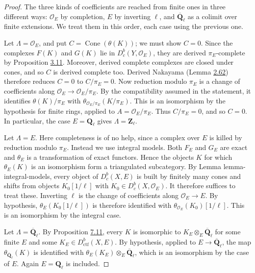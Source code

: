 \documentclass[11pt]{article}
\providecommand{\Cone}{}\renewcommand{\Cone}{\operatorname{Cone}}
\providecommand{\Dbc}{}\renewcommand{\Dbc}{D^b_c}
\begin{document}
\begin{proof}[{Proof}]\label{bp635}%
The three kinds of coefficients are reached from finite ones in three different ways: \(\mathcal O_E\) by completion, \(E\) by inverting \(\ell\), and \(\overline{\mathbf Q}_\ell\) as a colimit over finite extensions. We treat them in this order, each case using the previous one.

Let \(\Lambda=\mathcal O_E\), and put \(C=\Cone(\theta(K))\); we must show \(C=0\). Since the complexes \(F(K)\) and \(G(K)\) lie in \(\Dbc(Y,\mathcal O_E)\), they are derived \(\pi_E\)-complete by Proposition \hyperref[bp226]{3.11}. Moreover, derived complete complexes are closed under cones, and so \(C\) is derived complete too. Derived Nakayama (Lemma \hyperref[bp190]{2.62}) therefore reduces \(C=0\) to \(C/\pi_E=0\). Now reduction modulo \(\pi_E\) is a change of coefficients along \(\mathcal O_E\to\mathcal O_E/\pi_E\). By the compatibility assumed in the statement, it identifies \(\theta(K)/\pi_E\) with \(\theta_{\mathcal O_E/\pi_E}(K/\pi_E)\). This is an isomorphism by the hypothesis for finite rings, applied to \(A=\mathcal O_E/\pi_E\). Thus \(C/\pi_E=0\), and so \(C=0\). In particular, the case \(E=\mathbf Q_\ell\) gives \(\Lambda=\mathbf Z_\ell\).

Let \(\Lambda=E\). Here completeness is of no help, since a complex over \(E\) is killed by reduction modulo \(\pi_E\). Instead we use integral models. Both \(F_E\) and \(G_E\) are exact and \(\theta_E\) is a transformation of exact functors. Hence the objects \(K\) for which \(\theta_E(K)\) is an isomorphism form a triangulated subcategory. By Lemma lemma-integral-models, every object of \(\Dbc(X,E)\) is built by finitely many cones and shifts from objects \(K_0[1/\ell]\) with \(K_0\in\Dbc(X,\mathcal O_E)\). It therefore suffices to treat these. Inverting \(\ell\) is the change of coefficients along \(\mathcal O_E\to E\). By hypothesis, \(\theta_E(K_0[1/\ell])\) is therefore identified with \(\theta_{\mathcal O_E}(K_0)[1/\ell]\). This is an isomorphism by the integral case.

Let \(\Lambda=\overline{\mathbf Q}_\ell\). By Proposition \hyperref[bp629]{7.11}, every \(K\) is isomorphic to \(K_E\otimes_E\overline{\mathbf Q}_\ell\) for some finite \(E\) and some \(K_E\in D^b_{\mathrm{ctf}}(X,E)\). By hypothesis, applied to \(E\to\overline{\mathbf Q}_\ell\), the map \(\theta_{\overline{\mathbf Q}_\ell}(K)\) is identified with \(\theta_E(K_E)\otimes_E\overline{\mathbf Q}_\ell\), which is an isomorphism by the case of \(E\). Again \(E=\mathbf Q_\ell\) is included.
\end{proof}
\end{document}
